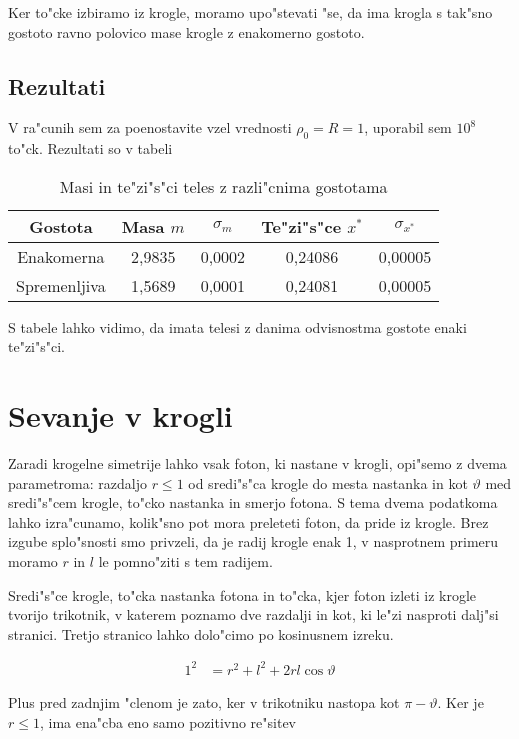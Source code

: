 \documentclass[a4paper,10pt]{article}
\renewcommand{\theta}{\vartheta}
\begin{document}
Ker to"cke izbiramo iz krogle, moramo upo"stevati "se, da ima krogla s tak"sno gostoto ravno polovico mase krogle z enakomerno gostoto. 

\subsection{Rezultati}

V ra"cunih sem za poenostavite vzel vrednosti $\rho_0 = R = 1$, uporabil sem $10^8$ to"ck. Rezultati so v tabeli

\begin{table}[h!]
 \centering
\begin{tabular}{|c|c|c|c|c|}
 \hline
Gostota & Masa $m$ & $\sigma_m$ & Te"zi"s"ce $x^*$ & $\sigma_{x^*}$ \\
\hline
Enakomerna & 2,9835 & 0,0002 & 0,24086 & 0,00005 \\
Spremenljiva & 1,5689 & 0,0001 & 0,24081 & 0,00005 \\
\hline
\end{tabular}
\caption{Masi in te"zi"s"ci teles z razli"cnima gostotama}
\end{table}

S tabele lahko vidimo, da imata telesi z danima odvisnostma gostote enaki te"zi"s"ci. 

\section{Sevanje v krogli}

Zaradi krogelne simetrije lahko vsak foton, ki nastane v krogli, opi"semo z dvema parametroma: razdaljo $r\leq1$ od sredi"s"ca krogle do mesta nastanka in kot $\theta$ med sredi"s"cem krogle, to"cko nastanka in smerjo fotona. S tema dvema podatkoma lahko izra"cunamo, kolik"sno pot mora preleteti foton, da pride iz krogle. Brez izgube splo"snosti smo privzeli, da je radij krogle enak 1, v nasprotnem primeru moramo $r$ in $l$ le pomno"ziti s tem radijem. 

Sredi"s"ce krogle, to"cka nastanka fotona in to"cka, kjer foton izleti iz krogle tvorijo trikotnik, v katerem poznamo dve razdalji in kot, ki le"zi nasproti dalj"si stranici. Tretjo stranico lahko dolo"cimo po kosinusnem izreku. 

\begin{align}
 1^2 &= r^2 + l^2 + 2rl\cos\theta \label{eq:kosinusni}
\end{align}

Plus pred zadnjim "clenom je zato, ker v trikotniku nastopa kot $\pi-\theta$. Ker je $r\leq1$, ima ena"cba eno samo pozitivno re"sitev
\end{document}
